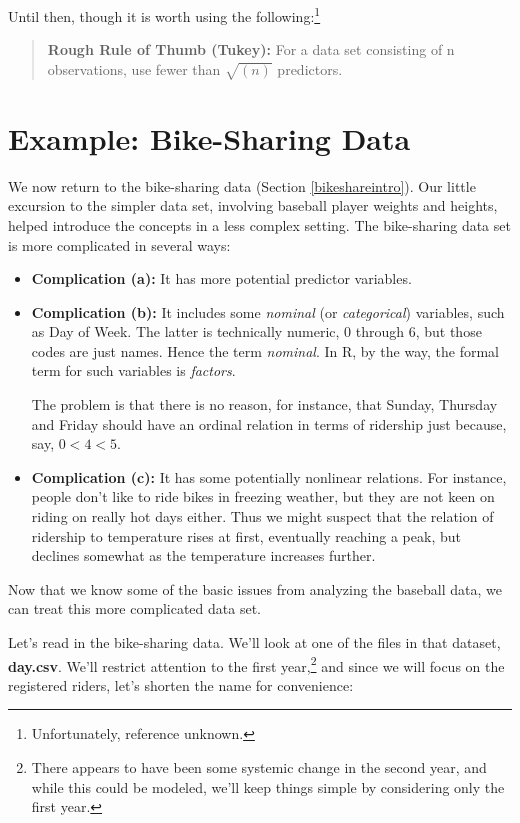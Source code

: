 Until then, though it is worth using the
following:\footnote{Unfortunately, reference
unknown.}

\begin{quote}
{\bf Rough Rule of Thumb (Tukey):} For a data set consisting of n
observations, use fewer than $\sqrt{(n)}$ predictors.
\end{quote}

\section{Example:  Bike-Sharing Data}
\label{returnbike}

We now return to the bike-sharing data (Section \ref{bikeshareintro}).
Our little excursion to the simpler data set, involving baseball player
weights and heights, helped introduce the concepts in a less complex
setting.  The bike-sharing data set is more complicated in several ways:

\begin{itemize}

\item {\bf Complication (a):} It has more potential predictor variables.

\item {\bf Complication (b):} It includes some {\it nominal} (or {\it
categorical}) variables, such as Day of Week.  The latter is technically
numeric, 0 through 6, but those codes are just names. Hence the term
{\it nominal}. In R, by the way, the formal term for such variables is
{\it factors}. 

The problem is that there is no reason, for instance, that Sunday,
Thursday and Friday should have an ordinal relation in terms of
ridership just because, say, $0 < 4 < 5$.

\item {\bf Complication (c):} It has some potentially nonlinear
relations.  For instance, people don't like to ride bikes in freezing
weather, but they are not keen on riding on really hot days either.
Thus we might suspect that the relation of ridership to temperature
rises at first, eventually reaching a peak, but declines somewhat as the
temperature increases further.  \label{complicc}

\end{itemize}  

Now that we know some of the basic issues from analyzing the baseball
data, we can treat this more complicated data set.  

Let's read in the bike-sharing data.  We'll look at one of the files in
that dataset, {\bf day.csv}.  We'll restrict attention to the first
year,\footnote{There appears to have been some systemic change in the
second year, and while this could be modeled, we'll keep things simple
by considering only the first year.} and since we will focus on the
registered riders, let's shorten the name for convenience:

